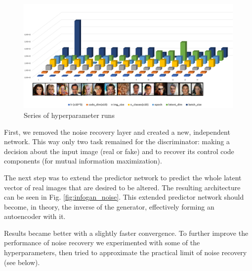 \documentclass{egpubl}
\begin{document}
\begin{figure}[!ht]
	\centering
	\includegraphics[width=\textwidth]{pic/hyperparamopt}
	\caption{Series of hyperparameter runs}
	\label{fig:hyperparamteres}
\end{figure}


First, we removed the noise recovery layer and created a new, independent network. This way only two task remained for the discriminator: making a decision about the input image (real or fake) and to recover its control code components (for mutual information maximization).



The next step was to extend the predictor network to predict the whole latent vector of real images that are desired to be altered. The resulting architecture can be seen in Fig. \ref{fig:infogan_noise}. This extended predictor network should become, in theory, the inverse of the generator, effectively forming an autoencoder with it.




Results became better with a slightly faster convergence. To further improve the performance of noise recovery we experimented with some of the hyperparameters, then tried to approximate the practical limit of noise recovery (see below).
\end{document}
